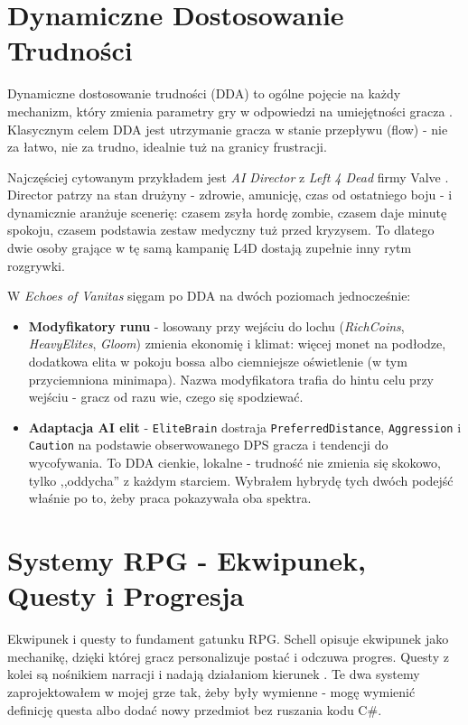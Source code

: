 \section{Dynamiczne Dostosowanie Trudności}

Dynamiczne dostosowanie trudności (DDA) to ogólne pojęcie na każdy mechanizm, który zmienia parametry gry w odpowiedzi na umiejętności gracza \cite{hunicke2005dda}. Klasycznym celem DDA jest utrzymanie gracza w stanie przepływu (flow) - nie za łatwo, nie za trudno, idealnie tuż na granicy frustracji.

Najczęściej cytowanym przykładem jest \textit{AI Director} z \textit{Left 4 Dead} firmy Valve \cite{booth2009left4dead}. Director patrzy na stan drużyny - zdrowie, amunicję, czas od ostatniego boju - i dynamicznie aranżuje scenerię: czasem zsyła hordę zombie, czasem daje minutę spokoju, czasem podstawia zestaw medyczny tuż przed kryzysem. To dlatego dwie osoby grające w tę samą kampanię L4D dostają zupełnie inny rytm rozgrywki.

W \textit{Echoes of Vanitas} sięgam po DDA na dwóch poziomach jednocześnie:
\begin{itemize}
    \item \textbf{Modyfikatory runu} - losowany przy wejściu do lochu (\textit{RichCoins}, \textit{HeavyElites}, \textit{Gloom}) zmienia ekonomię i klimat: więcej monet na podłodze, dodatkowa elita w pokoju bossa albo ciemniejsze oświetlenie (w tym przyciemniona minimapa). Nazwa modyfikatora trafia do hintu celu przy wejściu - gracz od razu wie, czego się spodziewać.
    \item \textbf{Adaptacja AI elit} - \texttt{EliteBrain} dostraja \texttt{PreferredDistance}, \texttt{Aggression} i \texttt{Caution} na podstawie obserwowanego DPS gracza i tendencji do wycofywania. To DDA cienkie, lokalne - trudność nie zmienia się skokowo, tylko ,,oddycha'' z każdym starciem. Wybrałem hybrydę tych dwóch podejść właśnie po to, żeby praca pokazywała oba spektra.
\end{itemize}

\section{Systemy RPG - Ekwipunek, Questy i Progresja}

Ekwipunek i questy to fundament gatunku RPG. Schell \cite{schell2008art} opisuje ekwipunek jako mechanikę, dzięki której gracz personalizuje postać i odczuwa progres. Questy z kolei są nośnikiem narracji i nadają działaniom kierunek \cite{salen2004rules}. Te dwa systemy zaprojektowałem w mojej grze tak, żeby były wymienne - mogę wymienić definicję questa albo dodać nowy przedmiot bez ruszania kodu C\#.

